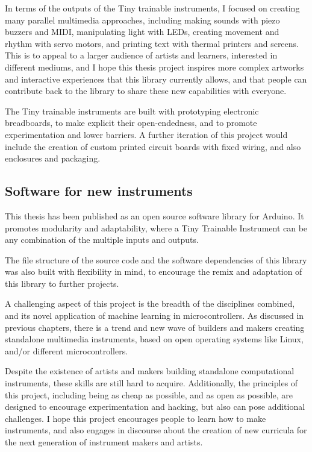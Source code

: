 In terms of the outputs of the Tiny trainable instruments, I focused on creating many parallel multimedia approaches, including making sounds with piezo buzzers and MIDI, manipulating light with LEDs, creating movement and rhythm with servo motors, and printing text with thermal printers and screens. This is to appeal to a larger audience of artists and learners, interested in different mediums, and I hope this thesis project inspires more complex artworks and interactive experiences that this library currently allows, and that people can contribute back to the library to share these new capabilities with everyone.

The Tiny trainable instruments are built with prototyping electronic breadboards, to make explicit their open-endedness, and to promote experimentation and lower barriers. A further iteration of this project would include the creation of custom printed circuit boards with fixed wiring, and also enclosures and packaging.

\subsection{Software for new instruments}

This thesis has been published as an open source software library for Arduino. It promotes modularity and adaptability, where a Tiny Trainable Instrument can be any combination of the multiple inputs and outputs.

The file structure of the source code and the software dependencies of this library was also built with flexibility in mind, to encourage the remix and adaptation of this library to further projects.

A challenging aspect of this project is the breadth of the disciplines combined, and its novel application of machine learning in microcontrollers. As discussed in previous chapters, there is a trend and new wave of builders and makers creating standalone multimedia instruments, based on open operating systems like Linux, and/or different microcontrollers. 

Despite the existence of artists and makers building standalone computational instruments, these skills are still hard to acquire. Additionally, the principles of this project, including being as cheap as possible, and as open as possible, are designed to encourage experimentation and hacking, but also can pose additional challenges. I hope this project encourages people to learn how to make instruments, and also engages in discourse about the creation of new curricula for the next generation of instrument makers and artists.

